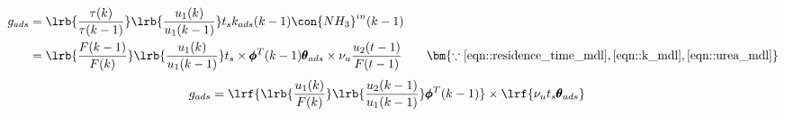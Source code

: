 \begin{align*}
        g_{ads} &= \lrb{\frac{\tau(k)}{\tau(k-1)}}
                                \lrb{\frac{u_1(k)}{u_1(k-1)}}
                t_s k_{ads}(k-1) \con{NH_3}^{in}(k-1)\\
        &=\lrb{\frac{F(k-1)}{F(k)}}\lrb{\frac{u_1(k)}{u_1(k-1)}}
                t_s \times \pmb \phi^T(k-1) \pmb \theta_{ads} \times \nu_u \frac{u_2(t-1)}{F(t-1)}
                \qquad
                \bm{\because \ref{eqn::residence_time_mdl}, \ref{eqn::k_mdl}, \ref{eqn::urea_mdl}}
\end{align*}
\begin{align}
       g_{ads} &=  \lrf{\lrb{\frac{u_1(k)}{F(k)}}\lrb{\frac{u_2(k-1)}{u_1(k-1)}} \pmb \phi^T(k-1) }
                \times \lrf{\nu_u t_s \pmb \theta_{ads}}
\end{align}
